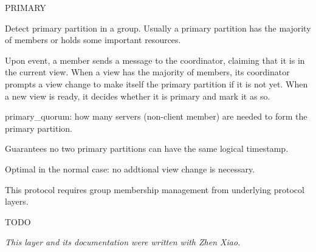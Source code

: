 %
%
%
\begin{Layer}{PRIMARY}

Detect primary partition in a group. Usually a primary partition has
the majority of members or holds some important resources.
\begin{Protocol}
Upon  event, a member sends a message to the coordinator,
claiming that it is in the current view. When a view has the majority
of members, its coordinator prompts a view change to make itself the
primary partition if it is not yet.  When a new view is ready, it
decides whether it is primary and mark it as so.
\end{Protocol}

\begin{Parameters}
\item primary\_quorum: how many servers (non-client member) are
needed to form the primary partition.
\end{Parameters}

\begin{Properties}
\item
Guarantees no two primary partitions can have the same logical timestamp.
\item
Optimal in the normal case: no addtional view change is necessary.
\item
This protocol requires group membership management from underlying
protocol layers. 
\end{Properties}

\begin{Sources}
\end{Sources}

\begin{GenEvent}
\end{GenEvent}

\begin{Testing}
\item
TODO
\end{Testing}

\emph{This layer and its documentation were written with Zhen Xiao.}
\end{Layer}
